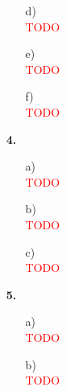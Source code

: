 \documentclass[a4paper,11pt,fleqn]{scrartcl}
\begin{document}
\begin{enumerate}
\begin{enumerate}
			\item[d)]\quad \\
				\textcolor{red}{TODO}
			\item[e)]\quad \\
				\textcolor{red}{TODO}
			\item[f)]\quad \\
				\textcolor{red}{TODO}
		\end{enumerate}
		\item[\textbf{4.}]
		\begin{enumerate}
			\item[a)]\quad \\
				\textcolor{red}{TODO}
			\item[b)]\quad \\
				\textcolor{red}{TODO}
			\item[c)]\quad \\
				\textcolor{red}{TODO}
		\end{enumerate}
		\item[\textbf{5.}]
		\begin{enumerate}
			\item[a)]\quad \\
				\textcolor{red}{TODO}
			\item[b)]\quad \\
				\textcolor{red}{TODO}
		\end{enumerate}
	\end{enumerate}
\end{document}
